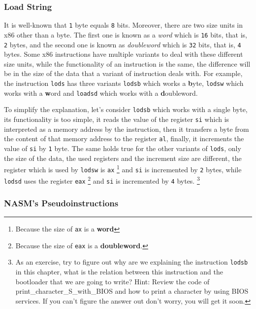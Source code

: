 \subsubsection{Load String}\label{load-string}

It is well-known that \lstinline!1! byte equals \lstinline!8! bits.
Moreover, there are two size units in x86 other than a byte. The first
one is known as a \emph{word} which is \lstinline!16! bits, that is,
\lstinline!2! bytes, and the second one is known as \emph{doubleword}
which is \lstinline!32! bits, that is, \lstinline!4! bytes. Some x86
instructions have multiple variants to deal with these different size
units, while the functionality of an instruction is the same, the
difference will be in the size of the data that a variant of instruction
deals with. For example, the instruction \lstinline!lods! has three
variants \lstinline!lodsb! which works a \textbf{b}yte,
\lstinline!lodsw! which works with a \textbf{w}ord and
\lstinline!loadsd! which works with a \textbf{d}oubleword.

To simplify the explanation, let's consider \lstinline!lodsb! which
works with a single byte, its functionality is too simple, it reads the
value of the register \lstinline!si! which is interpreted as a memory
address by the instruction, then it transfers a byte from the content of
that memory address to the register \lstinline!al!, finally, it
increments the value of \lstinline!si! by \lstinline!1! byte. The same
holds true for the other variants of \lstinline!lods!, only the size of
the data, the used registers and the increment size are different, the
register which is used by \lstinline!lodsw! is \lstinline!ax! \footnote{Because
  the size of \lstinline!ax! is a \textbf{word}} and \lstinline!si! is
incremented by \lstinline!2! bytes, while \lstinline!lodsd! uses the
register \lstinline!eax! \footnote{Because the size of \lstinline!eax!
  is a \textbf{doubleword}.} and \lstinline!si! is incremented by
\lstinline!4! bytes. \footnote{As an exercise, try to figure out why are
  we explaining the instruction \lstinline!lodsb! in this chapter, what
  is the relation between this instruction and the bootloader that we
  are going to write? Hint: Review the code of
  print\_character\_S\_with\_BIOS and how to print a character by using
  BIOS services. If you can't figure the answer out don't worry, you
  will get it soon.}

\subsubsection{NASM's
Pseudoinstructions}\label{nasms-pseudoinstructions}

